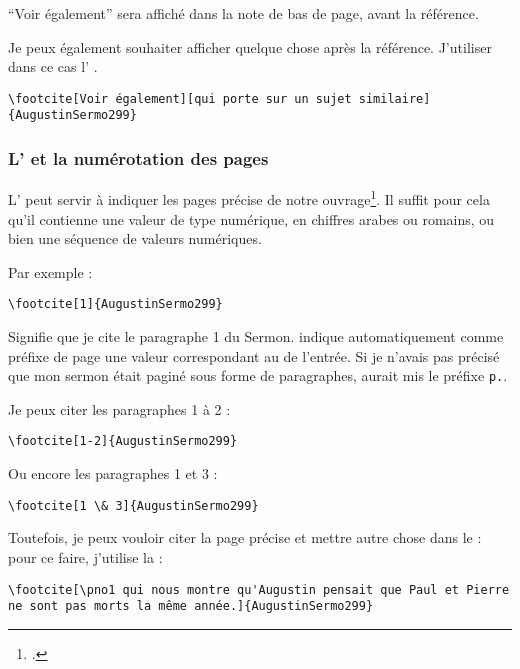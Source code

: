 \enquote{Voir également} sera affiché dans la note de bas de page, avant la référence.

Je peux également souhaiter afficher quelque chose après la référence. J'utiliser dans ce cas l' .

\begin{verbatim}
\footcite[Voir également][qui porte sur un sujet similaire]{AugustinSermo299}
\end{verbatim}

\subsubsection{L'  et la numérotation des pages}

L'  peut servir à indiquer les pages précise de notre ouvrage\footcite[On consultera pour plus de détails : ][105-106]{BibLaTeX}. Il suffit pour cela qu'il contienne une valeur de type numérique, en chiffres arabes ou romains, ou bien une séquence de valeurs numériques.

Par exemple : 
\begin{verbatim}
\footcite[1]{AugustinSermo299}
\end{verbatim}

Signifie que je cite le paragraphe 1 du Sermon.  indique automatiquement comme préfixe de page une valeur correspondant au   de l'entrée. Si je n'avais pas précisé que mon sermon était paginé sous forme de paragraphes,  aurait mis le préfixe \verb|p.|.

Je peux citer les paragraphes 1 à 2 :

\begin{verbatim}
\footcite[1-2]{AugustinSermo299}
\end{verbatim}

Ou encore les paragraphes 1 et 3 :

\begin{verbatim}
\footcite[1 \& 3]{AugustinSermo299}
\end{verbatim}

Toutefois, je peux vouloir citer la page précise et mettre autre chose dans le   : pour ce faire, j'utilise la   :

\begin{verbatim}
\footcite[\pno1 qui nous montre qu'Augustin pensait que Paul et Pierre ne sont pas morts la même année.]{AugustinSermo299}
\end{verbatim}

